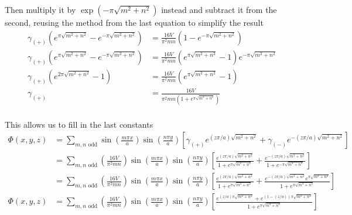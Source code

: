 \documentclass{article}
\begin{document}
Then multiply it by $\exp\left(-\pi\sqrt{m^{2} + n^{2}}\right)$ instead and subtract it from the second, reusing the method from the last equation to simplify the result
\begin{align*}
\gamma_{(+)}\left( e^{\pi\sqrt{m^{2} + n^{2}}} - e^{-\pi\sqrt{m^{2} + n^{2}}} \right) &= \frac{16V}{\pi^{2}mn} \left( 1 - e^{-\pi\sqrt{m^{2} + n^{2}}} \right)\\
\gamma_{(+)}\left( e^{\pi\sqrt{m^{2} + n^{2}}} - e^{-\pi\sqrt{m^{2} + n^{2}}} \right) &= \frac{16V}{\pi^{2}mn} \left( e^{\pi\sqrt{m^{2} + n^{2}}} - 1 \right) e^{-\pi\sqrt{m^{2} + n^{2}}}\\
\gamma_{(+)}\left( e^{2\pi\sqrt{m^{2} + n^{2}}} - 1 \right) &= \frac{16V}{\pi^{2}mn} \left( e^{\pi\sqrt{m^{2} + n^{2}}} - 1 \right)\\
\gamma_{(+)} &= \frac{16V}{\pi^{2}mn \left( 1 + e^{\pi\sqrt{m^{2} + n^{2}}} \right) }\\
\end{align*}

This allows us to fill in the last constants
\begin{align*}
\Phi(x,y,z) &= \sum_{m,n \text{ odd}} \sin\left(\frac{ m\pi x }{ a }\right) \sin\left(\frac{ n\pi y }{ a }\right) \left[ \gamma_{(+)}e^{(z\pi/a)\sqrt{m^{2} + n^{2}}}+\gamma_{(-)}e^{-(z\pi/a)\sqrt{m^{2} + n^{2}}} \right]\\
&= \sum_{m,n \text{ odd}} \left(\frac{16V}{\pi^{2}mn}\right) \sin\left(\frac{ m\pi x }{ a }\right) \sin\left(\frac{ n\pi y }{ a }\right) \left[ \frac{ e^{(z\pi/a)\sqrt{m^{2} + n^{2}}} }{ 1 + e^{\pi\sqrt{m^{2} + n^{2}}} } + \frac{ e^{-(z\pi/a)\sqrt{m^{2} + n^{2}}} }{ 1 + e^{-\pi\sqrt{m^{2} + n^{2}}} }\right]\\
&= \sum_{m,n \text{ odd}} \left(\frac{16V}{\pi^{2}mn}\right) \sin\left(\frac{ m\pi x }{ a }\right) \sin\left(\frac{ n\pi y }{ a }\right) \left[ \frac{ e^{(z\pi/a)\sqrt{m^{2} + n^{2}}} }{ 1 + e^{\pi\sqrt{m^{2} + n^{2}}} } + \frac{ e^{-(z\pi/a)\sqrt{m^{2} + n^{2}}} e^{\pi\sqrt{m^{2} + n^{2}}} }{ 1 + e^{\pi\sqrt{m^{2} + n^{2}}} }\right]\\
\Phi(x,y,z) &= \boxed{ \sum_{m,n \text{ odd}} \left(\frac{16V}{\pi^{2}mn}\right) \sin\left(\frac{ m\pi x }{ a }\right) \sin\left(\frac{ n\pi y }{ a }\right) \left[ \frac{ e^{(z/a)\pi\sqrt{m^{2} + n^{2}}} + e^{(1-(z/a))\pi\sqrt{m^{2} + n^{2}}}}{ 1 + e^{\pi\sqrt{m^{2} + n^{2}}} } \right] }\\
\end{align*}
\end{document}
